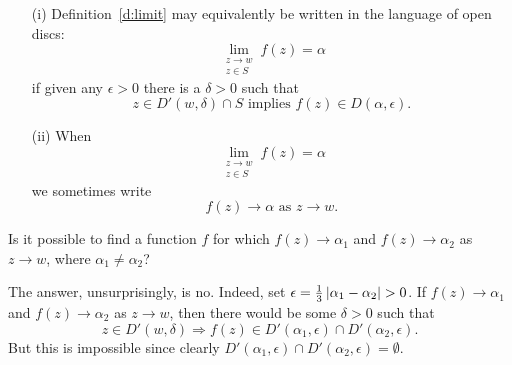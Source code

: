 

\begin{note}

\begin{enumerate}
\item[(i)]  Definition~\ref{d:limit} may equivalently be written in the language of open discs: 
\[
\lim_{\substack{z \to w \\ z \in S}} f(z) = \alpha
\]
if given any $\epsilon >0$ there is a $\delta >0 $ such that
\[
z \in D' (w, \delta ) \cap S \text{ implies } f(z) \in D( \alpha, \epsilon).
\]
\item[(ii)] When
\[ \lim_{\substack{z \to w \\ z \in S}} f(z) = \alpha \]
we sometimes write
\[
f(z) \to \alpha \text{ as } z \to w.
\]
\end{enumerate}

\end{note} 


\begin{example}
Is it possible to find a function $f$ for which $f(z) \to \alpha_1$ and $f(z) \to \alpha_2$ as $z \to w$, where $\alpha_1\neq\alpha_2$?
\begin{solution}
The answer, unsurprisingly, is no.  Indeed, set $\epsilon = \frac{1}{3} \abs{\alpha_1-\alpha_2}>0$.  If $f(z) \to \alpha_1$ and $f(z) \to \alpha_2$ as $z \to w$, then there would be some $\delta >0$ such that
\[
z \in D'(w,\delta) \Longrightarrow f(z) \in D'(\alpha_1 , \epsilon ) \cap D'(\alpha_2 , \epsilon).
\]
But this is impossible since clearly $D'(\alpha_1,\epsilon) \cap D'(\alpha_2 , \epsilon) = \emptyset$.
\end{solution} 
\end{example}
  
 
 
